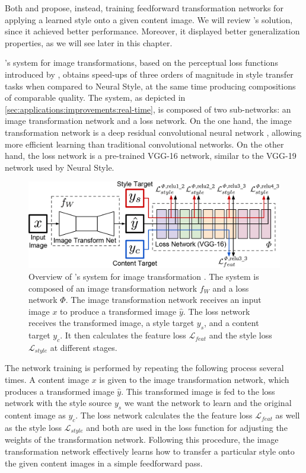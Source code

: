 Both \citet{Ulyanov2016} and \citet{Johnson2016} propose, instead, training feedforward transformation networks for applying a learned style onto a given content image.
We will review \citeauthor{Johnson2016}'s solution, since it achieved better performance.
Moreover, it displayed better generalization properties, as we will see later in this chapter.

\citeauthor{Johnson2016}'s system for image transformations, based on the perceptual loss functions introduced by \citeauthor{Gatys2015B}, obtains speed-ups of three orders of magnitude in style transfer tasks when compared to Neural Style, at the same time producing compositions of comparable quality.
The system, as depicted in \autoref{sec:applications:improvements:real-time}, is composed of two sub-networks: an image transformation network and a loss network.
On the one hand, the image transformation network is a deep residual convolutional neural network \cite{He2015}, allowing more efficient learning than traditional convolutional networks.
On the other hand, the loss network is a pre-trained VGG-16 network, similar to the VGG-19 network used by Neural Style.

\begin{figure}[t]
  \includegraphics[width=\textwidth]{gfx/app-real-time}
  \caption{
    Overview of \citeauthor{Johnson2016}'s system for image transformation \cite{Johnson2016}.
    The system is composed of an image transformation network $f_W$ and a loss network $\mathit{\Phi}$.
    The image transformation network receives an input image $x$ to produce a transformed image $\hat{y}$.
    The loss network receives the transformed image, a style target $y_s$, and a content target $y_c$.
    It then calculates the feature loss $\mathcal{L}_{feat}$ and the style loss $\mathcal{L}_{style}$ at different stages.
  }
  \label{sec:applications:improvements:real-time}
\end{figure}

The network training is performed by repeating the following process several times.
A content image $x$ is given to the image transformation network, which produces a transformed image $\hat{y}$.
This transformed image is fed to the loss network with the style source $y_s$ we want the network to learn and the original content image as $y_c$.
The loss network calculates the the feature loss $\mathcal{L}_{feat}$ as well as the style loss $\mathcal{L}_{style}$ and both are used in the loss function for adjusting the weights of the transformation network.
Following this procedure, the image transformation network effectively learns how to transfer a particular style onto the given content images in a simple feedforward pass.


